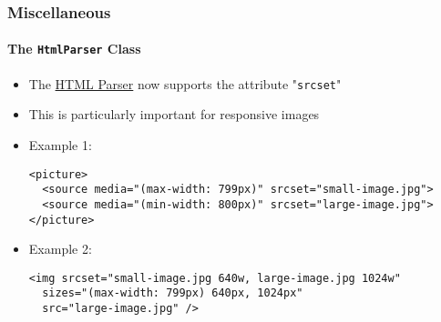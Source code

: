 %

\begin{frame}[fragile]
	\frametitle{Miscellaneous}
	\framesubtitle{The \texttt{HtmlParser} Class}


	\begin{itemize}
		\item The
			\href{https://docs.typo3.org/m/typo3/reference-coreapi/master/en-us/ApiOverview/Examples/ParsingHtml/Index.html}{HTML Parser}
			now supports the attribute "\texttt{srcset}"
		\item This is particularly important for responsive images
		\item Example 1:
\begin{lstlisting}
<picture>
  <source media="(max-width: 799px)" srcset="small-image.jpg">
  <source media="(min-width: 800px)" srcset="large-image.jpg">
</picture>
\end{lstlisting}
		\item Example 2:
\begin{lstlisting}
<img srcset="small-image.jpg 640w, large-image.jpg 1024w"
  sizes="(max-width: 799px) 640px, 1024px"
  src="large-image.jpg" />
\end{lstlisting}

	\end{itemize}

\end{frame}

